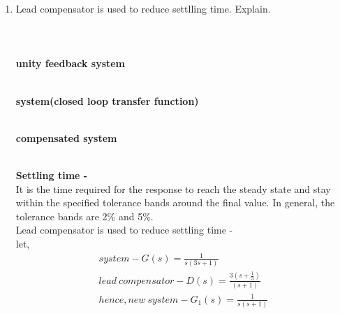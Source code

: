 \begin{enumerate}[label=\thesection.\arabic*.,ref=\thesection.\theenumi]
\item Lead compensator is used to reduce settlling time. Explain.\\
\\
\solution 
\\
\\
\textbf{unity feedback system}
\begin{figure}[h]
\begin{center}
\resizebox{\columnwidth}{!}{}
\end{center}
\end{figure}\\

\textbf{system(closed loop transfer function)}
\begin{figure}[h]
\begin{center}
\resizebox{\columnwidth}{!}{}
\end{center}
\end{figure}\\

 \textbf{compensated system}
\begin{figure}[h]
\begin{center}
\resizebox{\columnwidth}{!}{}
\end{center}
\end{figure}\\
\textbf{Settling time - }\\
It is the time required for the response to reach the steady state and stay within the specified tolerance bands around the final value. In general, the tolerance bands are 2\% and 5\%.
\\
Lead compensator is used to reduce settling time - \\
let,\\
\begin{align}
system-G(s) = \frac{1}{s(3s+1)}\\
lead\ compensator-D(s) = \frac{3(s+\frac{1}{3})}{(s+1)} \\
hence, new\ system-G_{1}(s) = \frac{1}{s(s+1)}
\end{align}
\\


\end{enumerate}
